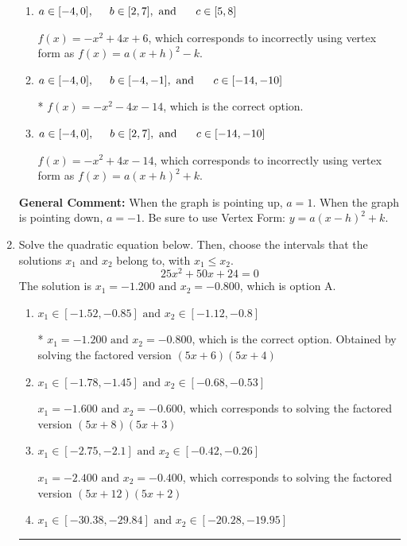 \documentclass{extbook}[14pt]
\newcommand{\litem}[1]{\item #1

\rule{\textwidth}{0.4pt}}
\begin{document}
\begin{enumerate}
{\begin{enumerate}[label=\Alph*.]
$f(x)=x^{2} -4 x -6$, which corresponds to incorrectly using vertex form as $f(x) = a(x+h)^2+k$ AND making $a$ the opposite sign than it should be.
\item \( a \in [-4, 0], \hspace*{5mm} b \in [2, 7], \text{ and } \hspace*{5mm} c \in [5, 8] \)

$f(x)=-x^{2} +4 x + 6$, which corresponds to incorrectly using vertex form as $f(x) = a(x+h)^2 - k$.
\item \( a \in [-4, 0], \hspace*{5mm} b \in [-4, -1], \text{ and } \hspace*{5mm} c \in [-14, -10] \)

* $f(x)=-x^{2} -4 x -14$, which is the correct option.
\item \( a \in [-4, 0], \hspace*{5mm} b \in [2, 7], \text{ and } \hspace*{5mm} c \in [-14, -10] \)

$f(x)=-x^{2} +4 x -14$, which corresponds to incorrectly using vertex form as $f(x) = a(x+h)^2+k$.
\end{enumerate}

\textbf{General Comment:} When the graph is pointing up, $a=1$. When the graph is pointing down, $a=-1$. Be sure to use Vertex Form: $y = a(x-h)^2+k$.
}
\litem{
Solve the quadratic equation below. Then, choose the intervals that the solutions $x_1$ and $x_2$ belong to, with $x_1 \leq x_2$.
\[ 25x^{2} +50 x + 24 = 0 \]The solution is \( x_1 = -1.200 \text{ and } x_2 = -0.800 \), which is option A.\begin{enumerate}[label=\Alph*.]
\item \( x_1 \in [-1.52, -0.85] \text{ and } x_2 \in [-1.12, -0.8] \)

* $x_1 = -1.200 \text{ and } x_2 = -0.800$, which is the correct option. Obtained by solving the factored version $(5x + 6)(5x + 4)$
\item \( x_1 \in [-1.78, -1.45] \text{ and } x_2 \in [-0.68, -0.53] \)

$x_1 = -1.600 \text{ and } x_2 = -0.600$, which corresponds to solving the factored version $(5x + 8)(5x + 3)$
\item \( x_1 \in [-2.75, -2.1] \text{ and } x_2 \in [-0.42, -0.26] \)

$x_1 = -2.400 \text{ and } x_2 = -0.400$, which corresponds to solving the factored version $(5x + 12)(5x + 2)$
\item \( x_1 \in [-30.38, -29.84] \text{ and } x_2 \in [-20.28, -19.95] \)


\end{enumerate}}
\end{enumerate}
\end{document}
